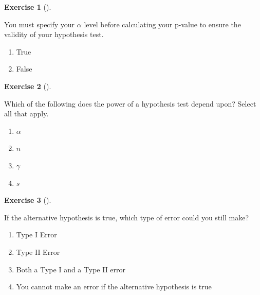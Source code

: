 \documentclass[
  letterpaper,
  DIV=11,
  numbers=noendperiod]{scrreprt}
\providecommand{\tightlist}{%
  \setlength{\itemsep}{0pt}\setlength{\parskip}{0pt}}\usepackage{longtable,booktabs,array}
\theoremstyle{definition}
\newtheorem{exercise}{Exercise}[chapter]
\theoremstyle{remark}
\begin{document}
\begin{exercise}[]\protect\hypertarget{exr-ch12-c04}{}\label{exr-ch12-c04}

You must specify your \(\alpha\) level before calculating your p-value
to ensure the validity of your hypothesis test.

\begin{enumerate}
\def\labelenumi{\alph{enumi})}
\tightlist
\item
  True
\item
  False
\end{enumerate}

\end{exercise}

\begin{exercise}[]\protect\hypertarget{exr-ch12-c05}{}\label{exr-ch12-c05}

Which of the following does the power of a hypothesis test depend upon?
Select all that apply.

\begin{enumerate}
\def\labelenumi{\alph{enumi})}
\tightlist
\item
  \(\alpha\)
\item
  \(n\)
\item
  \(\gamma\)
\item
  \(s\)
\end{enumerate}

\end{exercise}

\begin{exercise}[]\protect\hypertarget{exr-ch12-c06}{}\label{exr-ch12-c06}

If the alternative hypothesis is true, which type of error could you
still make?

\begin{enumerate}
\def\labelenumi{\alph{enumi})}
\tightlist
\item
  Type I Error
\item
  Type II Error
\item
  Both a Type I and a Type II error
\item
  You cannot make an error if the alternative hypothesis is true
\end{enumerate}

\end{exercise}
\end{document}
